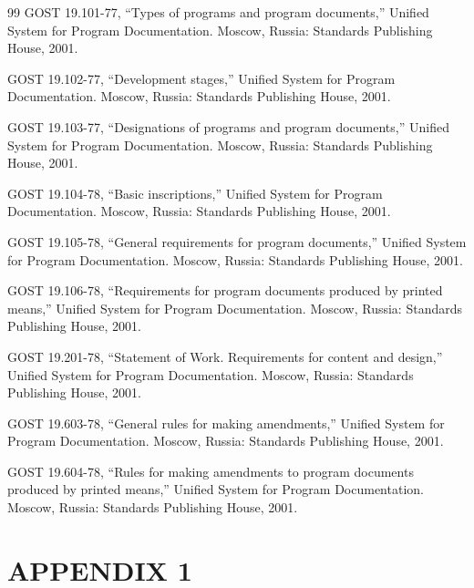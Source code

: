 \documentclass[12pt,a4paper]{extarticle}
\begin{document}
\renewcommand{\refname}{}
\begin{thebibliography}{99}
GOST 19.101-77, \enquote{Types of programs and program documents,} Unified System for Program Documentation. Moscow, Russia: Standards Publishing House, 2001.

GOST 19.102-77, \enquote{Development stages,} Unified System for Program Documentation. Moscow, Russia: Standards Publishing House, 2001.

GOST 19.103-77, \enquote{Designations of programs and program documents,} Unified System for Program Documentation. Moscow, Russia: Standards Publishing House, 2001.

GOST 19.104-78, \enquote{Basic inscriptions,} Unified System for Program Documentation. Moscow, Russia: Standards Publishing House, 2001.

GOST 19.105-78, \enquote{General requirements for program documents,} Unified System for Program Documentation. Moscow, Russia: Standards Publishing House, 2001.

GOST 19.106-78, \enquote{Requirements for program documents produced by printed means,} Unified System for Program Documentation. Moscow, Russia: Standards Publishing House, 2001.

GOST 19.201-78, \enquote{Statement of Work. Requirements for content and design,} Unified System for Program Documentation. Moscow, Russia: Standards Publishing House, 2001.

GOST 19.603-78, \enquote{General rules for making amendments,} Unified System for Program Documentation. Moscow, Russia: Standards Publishing House, 2001.

GOST 19.604-78, \enquote{Rules for making amendments to program documents produced by printed means,} Unified System for Program Documentation. Moscow, Russia: Standards Publishing House, 2001.
\end{thebibliography}

\clearpage

\section*{APPENDIX 1}
\end{document}
